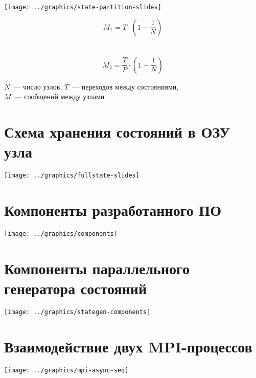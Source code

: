 \documentclass[12pt]{article}
\begin{document}
\begin{minipage}[m]{0.7\linewidth}
  \texttt{[image: ../graphics/state-partition-slides]}  
\end{minipage}
\begin{minipage}[m]{0.3\linewidth}
  $$ M_1 = T \cdot (1 - \frac{1}{N}) $$
  \\ ~ \\
  $$ M_2 = \frac{T}{P} \cdot (1 - \frac{1}{N}) $$
\end{minipage}

\begin{center}
  $N$~--- число узлов, $T$~--- переходов между состояниями, \\
  $M$~--- сообщений между узлами
\end{center}

\section{Схема хранения состояний в ОЗУ узла}
\label{sec:state-store-full}

\begin{center}
  \texttt{[image: ../graphics/fullstate-slides]}
\end{center}

\section{Компоненты разработанного ПО}
\label{sec:component-diag}

\begin{center}
  \texttt{[image: ../graphics/components]}
\end{center}

\section{Компоненты параллельного генератора состояний}
\label{sec:component-diag}

\begin{center}
  \texttt{[image: ../graphics/stategen-components]}
\end{center}

\section{Взаимодействие двух MPI-процессов}
\label{sec:mpi-sequence}

\begin{center}
  \texttt{[image: ../graphics/mpi-async-seq]}
\end{center}
\end{document}

